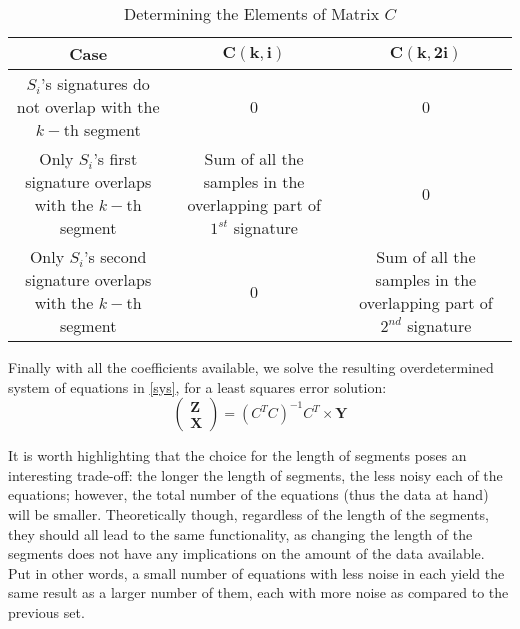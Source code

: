 \documentclass[conference]{IEEEtran}
\begin{document}
\begin{table}[tp]
\renewcommand{\arraystretch}{1.3}
\centering

    \caption{Determining the Elements of Matrix $C$}
    \label{C_elements}

    \begin{small}
    \begin{tabular}{|c|c|c|}
    \hline
    {\bf{Case}} & {$\mathbf{C(k,i)}$} & {$\mathbf{C(k,2i)}$}\\           
    \hline
    \parbox[t]{25mm}{\centering $S_i$'s signatures do not overlap with the $k-$th segment} & 0 & 0\\
    \hline
    \parbox[t]{25mm}{\centering Only $S_i$'s first signature overlaps with the  $k-$th segment} & \parbox[t]{25mm}{\centering Sum of all the samples in the overlapping part of $1^{st}$ signature} & 0\\

    \hline
    \parbox[t]{25mm}{\centering Only $S_i$'s second signature overlaps with the  $k-$th segment} & 0 & \parbox[t]{25mm}{\centering Sum of all the samples in the overlapping part of $2^{nd}$ signature} \\
    \hline
    \end{tabular}
    \end{small} 
\end{table}
 
Finally with all the coefficients available, we solve the resulting overdetermined system of equations in \ref{sys}, for a least squares error solution:
\begin{equation}
\left(\begin{array}{c}\mathbf{Z}\\\mathbf{X}\end{array}\right) = {(C^TC)}^{-1}C^T \times \mathbf{Y}
\label{sysLS}
\end{equation}

It is worth highlighting that the choice for the length of segments poses an interesting trade-off: the longer the length of segments, the less noisy each of the equations; however, the total number of the equations (thus the data at hand) will be smaller. Theoretically though, regardless of the length of the segments, they should all lead to the same functionality, as changing the length of the segments does not have any implications on the amount of the data available. Put in other words, a small number of equations with less noise in each yield the same result as a larger number of them, each with more noise as compared to the previous set. 
\end{document}
